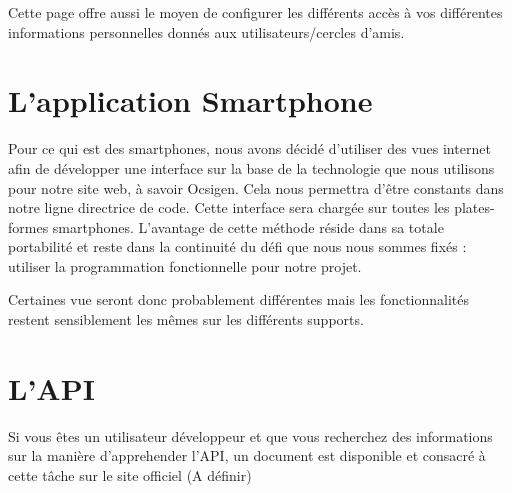 \documentclass{life-fr}
\begin{document}
Cette page offre aussi le moyen de configurer les différents accès à vos différentes informations personnelles donnés aux utilisateurs/cercles d'amis.

\section{L'application Smartphone}

Pour ce qui est des smartphones, nous avons décidé d'utiliser des vues internet afin de développer une interface sur la base de la technologie que nous utilisons pour notre site web, à savoir Ocsigen. Cela nous permettra d'être constants dans notre ligne directrice de code. Cette interface sera chargée sur toutes les plates-formes smartphones. L'avantage de cette méthode réside dans sa totale portabilité et reste dans la continuité du défi que nous nous sommes fixés : utiliser la programmation fonctionnelle pour notre projet.

Certaines vue seront donc probablement différentes mais les fonctionnalités restent sensiblement les mêmes sur les différents supports.

\section{L'API}

Si vous êtes un utilisateur développeur et que vous recherchez des informations sur la manière d'apprehender l'API, un document est disponible et consacré à cette tâche sur le site officiel (A définir)
\end{document}
